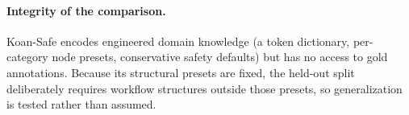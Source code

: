 \paragraph{Integrity of the comparison.} Koan-Safe encodes engineered
domain knowledge (a token dictionary, per-category node presets,
conservative safety defaults) but has no access to gold annotations.
Because its structural presets are fixed, the held-out split deliberately
requires workflow structures outside those presets, so generalization is
tested rather than assumed.
